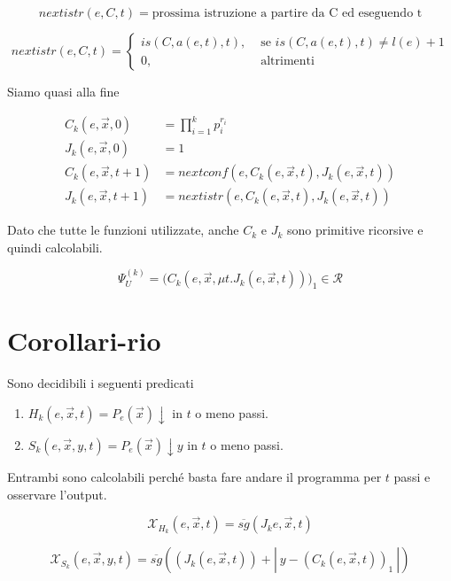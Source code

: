 $$
nextistr(e, C, t) = \text{prossima istruzione a partire da C ed eseguendo t}
$$

$$
nextistr(e,C,t) =\begin{cases}
is(C, a(e,t), t ), &\text{ se } is(C, a(e,t), t ) \neq l(e) +1 \\
0, &\text{ altrimenti}
\end{cases} 
$$

Siamo quasi alla fine

\begin{align*}
C_k (e, \vec{x}, 0) &= \prod\limits_{i=1}^{k} p_{i}^{r_i}\\
J_k(e,\vec{x}, 0) &= 1 \\
C_k (e, \vec{x}, t+1) &= nextconf(e, C_k(e,\vec{x}, t) , J_k(e, \vec{x}, t)) \\
J_k(e,\vec{x}, t+1) &= nextistr(e, C_k(e, \vec{x}, t) , J_k(e, \vec{x}, t)) 
\end{align*}

Dato che tutte le funzioni utilizzate, anche $ C_k $ e $ J_k $ sono primitive ricorsive e quindi calcolabili.

$$
\Psi_{U}^{(k)} = \Big(  C_k(e, \vec{x}, \mu t.J_k(e, \vec{x}, t)) \Big)_1 \in \mathcal{R}
$$



\section{Corollari-rio}

Sono decidibili i seguenti predicati

\begin{enumerate}
	\item $ H_k (e,\vec{x}, t) = P_e(\vec{x}) \downarrow $ in $ t $ o meno passi.
	\item $ S_k (e,\vec{x},y, t) = P_e(\vec{x}) \downarrow y $ in $ t $ o meno passi.
\end{enumerate}

Entrambi sono calcolabili perché basta fare andare il programma per $ t $ passi e osservare l'output.

$$
\mathcal{X}_{H_k}(e, \vec{x}, t) = \overline{sg}(J_k{e,\vec{x},t})
$$


$$
\mathcal{X}_{S_k}(e, \vec{x}, y, t) =  \overline{sg}((J_k(e,\vec{x},t)) + |\: y - (C_k(e,\vec{x},t) )_1\:|)
$$